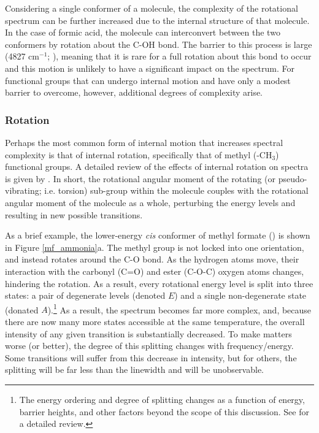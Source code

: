 \documentclass[twocolumn]{aastex631}
\begin{document}
Considering a single conformer of a molecule, the complexity of the rotational spectrum can be further increased due to the internal structure of that molecule.  In the case of formic acid, the molecule can interconvert between the two conformers by rotation about the C-OH bond.  The barrier to this process is large (4827 cm$^{-1}$; \citealt{Hocking:1976kv}), meaning that it is rare for a full rotation about this bond to occur and this motion is unlikely to have a significant impact on the spectrum.  For functional groups that can undergo internal motion and have only a modest barrier to overcome, however, additional degrees of complexity arise.  

\subsubsection{Rotation}

Perhaps the most common form of internal motion that increases spectral complexity is that of internal rotation, specifically that of methyl (-CH$_3$) functional groups.  A detailed review of the effects of internal rotation on spectra is given by \citet{Lin:1959eb}.  In short, the rotational angular moment of the rotating (or pseudo-vibrating; i.e. torsion) sub-group within the molecule couples with the rotational angular moment of the molecule as a whole, perturbing the energy levels and resulting in new possible transitions.

As a brief example, the lower-energy \emph{cis} conformer of methyl formate () is shown in Figure \ref{mf_ammonia}a.  The methyl group is not locked into one orientation, and instead rotates around the C-O bond.  As the hydrogen atoms move, their interaction with the carbonyl (C=O) and ester (C-O-C) oxygen atoms changes, hindering the rotation.  As a result, every rotational energy level is split into three states: a pair of degenerate levels (denoted $E$) and a single non-degenerate state (donated $A$).\footnote{The energy ordering and degree of splitting changes as a function of energy, barrier heights, and other factors beyond the scope of this discussion. See \citet{Lin:1959eb} for a detailed review.}  As a result, the spectrum becomes far more complex, and, because there are now many more states accessible at the same temperature, the overall intensity of any given transition is substantially decreased.  To make matters worse (or better), the degree of this splitting changes with frequency/energy. Some transitions will suffer from this decrease in intensity, but for others, the splitting will be far less than the linewidth and will be unobservable.
\end{document}
